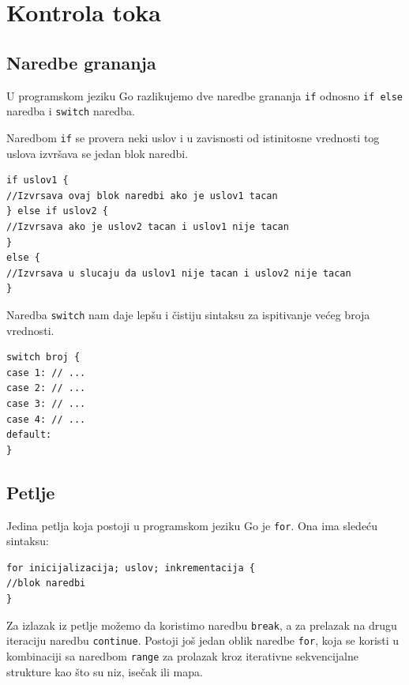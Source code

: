 \documentclass[a4paper]{article}
\begin{document}
\section{Kontrola toka}	
\label{sec:kontrola_toka}

\subsection{Naredbe grananja}
\label{subsec:naredbe_grananja}

U programskom jeziku Go razlikujemo dve naredbe grananja \texttt{if} odnosno \texttt{if else} naredba i \texttt{switch} naredba.

Naredbom \texttt{if} se provera neki uslov i u zavisnosti od istinitosne vrednosti tog uslova izvršava  se jedan blok naredbi. 

\begin{lstlisting}[caption={Primer \texttt{if} naredbe},frame=single, label=Primer_if_naredbe]
if uslov1 {
//Izvrsava ovaj blok naredbi ako je uslov1 tacan
} else if uslov2 {
//Izvrsava ako je uslov2 tacan i uslov1 nije tacan	
}
else {
//Izvrsava u slucaju da uslov1 nije tacan i uslov2 nije tacan
}
\end{lstlisting}

Naredba \texttt{switch} nam daje lepšu i čistiju sintaksu za ispitivanje većeg broja vrednosti.

\begin{lstlisting}[caption={Primer \texttt{switch} naredbe},frame=single, label=Primer_switch_naredbe]
switch broj {
case 1: // ...
case 2: // ...
case 3: // ...
case 4: // ...
default:
}
\end{lstlisting}


\subsection{Petlje}
\label{subsec:petlje}

Jedina petlja koja postoji u programskom jeziku Go je \texttt{for}. Ona ima sledeću sintaksu: 

\begin{lstlisting}[caption={Primer \texttt{for} petlje},frame=single, label=Primer_for_petlje]
for inicijalizacija; uslov; inkrementacija {
//blok naredbi
}
\end{lstlisting}

Za izlazak iz petlje možemo da koristimo naredbu \texttt{break}, a za prelazak na drugu iteraciju naredbu \texttt{continue}.
Postoji još jedan oblik naredbe \texttt{for}, koja se koristi u kombinaciji sa naredbom \texttt{range} za prolazak kroz iterativne sekvencijalne strukture kao što su niz, isečak ili mapa.
\end{document}
